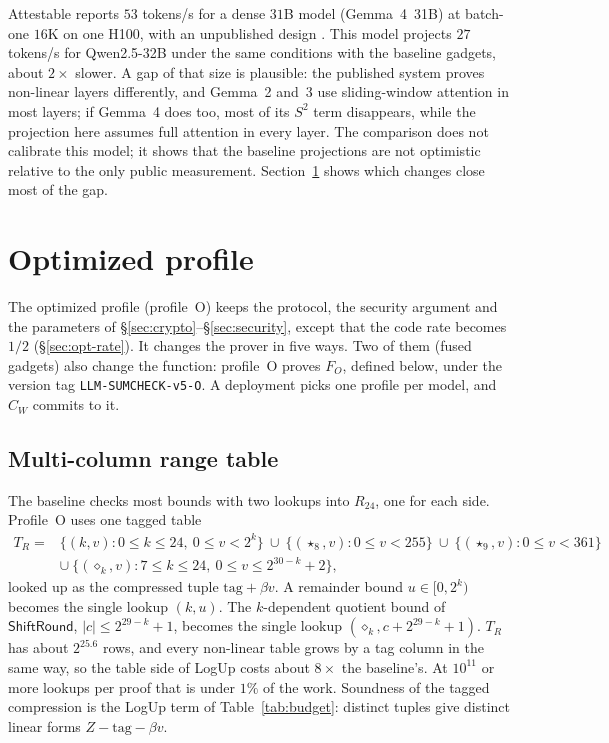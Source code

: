 \documentclass[11pt]{article}
\begin{document}
Attestable reports \(53\) tokens/s for a dense \(31\)B model (Gemma~4~31B) at batch-one \(16\)K on one H100, with an unpublished design \cite{attestable}.
This model projects \(27\) tokens/s for Qwen2.5-32B under the same conditions with the baseline gadgets, about \(2\times\) slower.
A gap of that size is plausible: the published system proves non-linear layers differently, and Gemma~2 and~3 use sliding-window attention in most layers; if Gemma~4 does too, most of its \(S^2\) term disappears, while the projection here assumes full attention in every layer.
The comparison does not calibrate this model; it shows that the baseline projections are not optimistic relative to the only public measurement.
Section~\ref{sec:opt} shows which changes close most of the gap.

\section{Optimized profile}
\label{sec:opt}

The optimized profile (profile~O) keeps the protocol, the security argument and the parameters of \S\ref{sec:crypto}--\S\ref{sec:security}, except that the code rate becomes \(1/2\) (\S\ref{sec:opt-rate}).
It changes the prover in five ways.
Two of them (fused gadgets) also change the function: profile~O proves \(F_O\), defined below, under the version tag \texttt{LLM-SUMCHECK-v5-O}.
A deployment picks one profile per model, and \(C_W\) commits to it.

\subsection{Multi-column range table}
\label{sec:opt-tuple}

The baseline checks most bounds with two lookups into \(R_{24}\), one for each side.
Profile~O uses one tagged table
\begin{align*}
T_R = {} & \{(k, v) : 0 \le k \le 24,\ 0 \le v < 2^k\}
\ \cup\ \{(\star_8, v) : 0 \le v < 255\}
\ \cup\ \{(\star_9, v) : 0 \le v < 361\} \\
& \cup\ \{(\diamond_k, v) : 7 \le k \le 24,\ 0 \le v \le 2^{30-k} + 2\},
\end{align*}
looked up as the compressed tuple \(\mathrm{tag} + \beta v\).
A remainder bound \(u \in [0, 2^k)\) becomes the single lookup \((k, u)\).
The \(k\)-dependent quotient bound of \(\mathsf{ShiftRound}\), \(|c| \le 2^{29-k} + 1\), becomes the single lookup \((\diamond_k, c + 2^{29-k} + 1)\).
\(T_R\) has about \(2^{25.6}\) rows, and every non-linear table grows by a tag column in the same way, so the table side of LogUp costs about \(8\times\) the baseline's.
At \(10^{11}\) or more lookups per proof that is under \(1\%\) of the work.
Soundness of the tagged compression is the LogUp term of Table~\ref{tab:budget}: distinct tuples give distinct linear forms \(Z - \mathrm{tag} - \beta v\).
\end{document}
